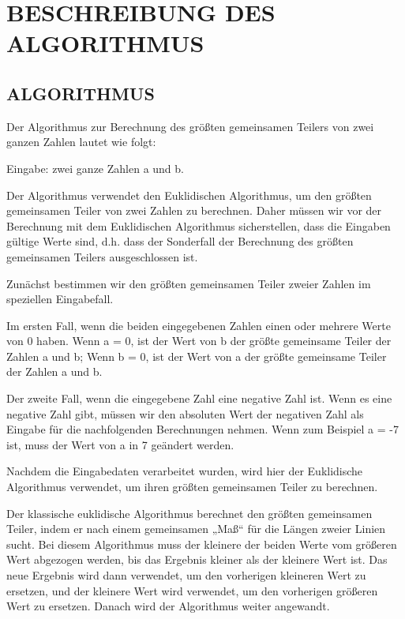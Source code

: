 \chapter{BESCHREIBUNG DES ALGORITHMUS}
\label{see:art}

\section{ALGORITHMUS}

Der Algorithmus zur Berechnung des größten gemeinsamen Teilers von zwei ganzen Zahlen lautet wie folgt:

\vspace{\baselineskip}

\noindent Eingabe: zwei ganze Zahlen a und b.

\noindent Der Algorithmus verwendet den Euklidischen Algorithmus, um den größten gemeinsamen Teiler von zwei Zahlen zu berechnen. Daher müssen wir vor der Berechnung mit dem Euklidischen Algorithmus sicherstellen, dass die Eingaben gültige Werte sind, d.h. dass der Sonderfall der Berechnung des größten gemeinsamen Teilers ausgeschlossen ist.

\noindent Zunächst bestimmen wir den größten gemeinsamen Teiler zweier Zahlen im speziellen Eingabefall.

\noindent Im ersten Fall, wenn die beiden eingegebenen Zahlen einen oder mehrere Werte von 0 haben. Wenn a = 0, ist der Wert von b der größte gemeinsame Teiler der Zahlen a und b; Wenn b = 0, ist der Wert von a der größte gemeinsame Teiler der Zahlen a und b. 

\noindent Der zweite Fall, wenn die eingegebene Zahl eine negative Zahl ist. Wenn es eine negative Zahl gibt, müssen wir den absoluten Wert der negativen Zahl als Eingabe für die nachfolgenden Berechnungen nehmen. Wenn zum Beispiel a = -7 ist, muss der Wert von a in 7 geändert werden.

\noindent Nachdem die Eingabedaten verarbeitet wurden, wird hier der Euklidische Algorithmus verwendet, um ihren größten gemeinsamen Teiler zu berechnen.

\vspace{\baselineskip}

\noindent Der klassische euklidische Algorithmus berechnet den größten gemeinsamen Teiler, indem er nach einem gemeinsamen „Maß“ für die Längen zweier Linien sucht\cite*{lambacher}. Bei diesem Algorithmus muss der kleinere der beiden Werte vom größeren Wert abgezogen werden, bis das Ergebnis kleiner als der kleinere Wert ist. Das neue Ergebnis wird dann verwendet, um den vorherigen kleineren Wert zu ersetzen, und der kleinere Wert wird verwendet, um den vorherigen größeren Wert zu ersetzen. Danach wird der Algorithmus weiter angewandt.

